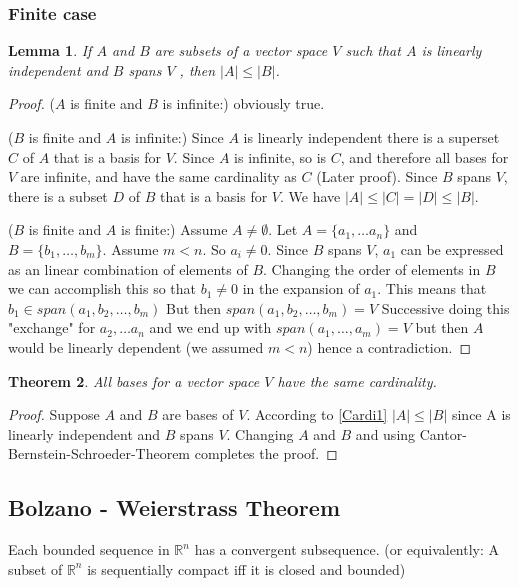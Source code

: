 \documentclass[titlepage]{article}
\newtheorem{thm}{Theorem}[section]
\newtheorem{lem}[thm]{Lemma}
\begin{document}
\subsubsection{Finite case}
\begin{lem}
\label{Cardi1}
If $A$ and $B$ are subsets of a vector space $V$ such that $A$ is linearly independent and $B$ spans $V$ , then $|A| \leq |B|$.
\end{lem}
\begin{proof}
($A$ is finite and $B$ is infinite:) obviously true.
 
($B$ is finite and $A$ is infinite:) Since $A$ is linearly independent there is a superset $C$ of $A$ that is a basis for $V$. Since $A$ is infinite, so is $C$, and therefore all bases for $V$ are infinite, and have the same cardinality as $C$ (Later proof). Since $B$ spans $V$, there is a subset $D$ of $B$ that is a basis for $V$. We have $|A| \leq |C| = |D| \leq |B|$. 

($B$ is finite and $A$ is finite:) Assume $A \neq \emptyset$. Let $A = \{a_1,\ldots a_n\}$ and $B = \{b_1,\ldots, b_m\}$. Assume  $m<n$. So $a_i \neq 0$. Since $B$ spans $V$, $a_1$ can be expressed as an linear combination of elements of $B$. Changing the order of elements in $B$ we can accomplish this so that $b_1 \neq 0$ in the expansion of $a_1$. This means that $b_1 \in span(a_1,b_2,\ldots , b_m)$ But then $span(a_1,b_2,\ldots , b_m) = V$
Successive  doing this "exchange" for $a_2,\ldots a_n$ and we end up with $span(a_1,\ldots,a_m) = V$ but then $A$ would be linearly dependent (we assumed $m<n$) hence a contradiction. 
\end{proof}

\begin{thm}
All bases for a vector space $V$ have the same cardinality.
\end{thm}
\begin{proof}
Suppose $A$ and $B$ are bases of $V$. According to \eqref{Cardi1} $|A| \leq |B|$ since A is linearly independent and $B$ spans $V$. Changing $A$ and $B$ and using Cantor-Bernstein-Schroeder-Theorem completes the proof.
\end{proof}





\subsection{Bolzano - Weierstrass Theorem}
Each bounded sequence in $\mathbb{R}^n$ has a convergent subsequence. 
(or equivalently: A subset of $\mathbb{R}^n$ is sequentially compact iff it is closed and bounded)
\end{document}
